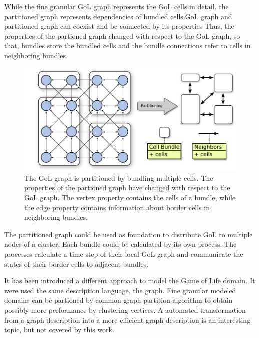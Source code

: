 While the fine granular GoL graph represents the GoL cells in detail,
the partitioned graph represents dependencies of bundled cells.GoL
graph and partitioned graph can coexist and be connected by its
properties Thus, the properties of the partioned graph changed with
respect to the GoL graph, so that, bundles store the bundled cells and
the bundle connections refer to cells in neighboring bundles.

\begin{figure}[H]
  \centering \includegraphics[width=\textwidth]{graphics/30_gol_bundle}
  \caption{The GoL graph is partitioned by bundling multiple
    cells. The properties of the partioned graph have changed with
    respect to the GoL graph. The vertex property contains the cells
    of a bundle, while the edge property contains information about
    border cells in neighboring bundles.}
  \label{fig:gol_bundle}
\end{figure}

The partitioned graph could be used as foundation to distribute GoL to
multiple nodes of a cluster. Each bundle could be calculated by its own
process. The processes calculate a time step of their local GoL graph and
communicate the states of their border cells to adjacent bundles.

It has been introduced a different approach to model the Game of Life
domain. It were used the same description language, the graph.  Fine
granular modeled domains can be partioned by common graph partition
algorithm to obtain possibly more performance by clustering
vertices. A automated transformation from a graph description into a
more efficient graph description is an interesting topic, but not
covered by this work.


